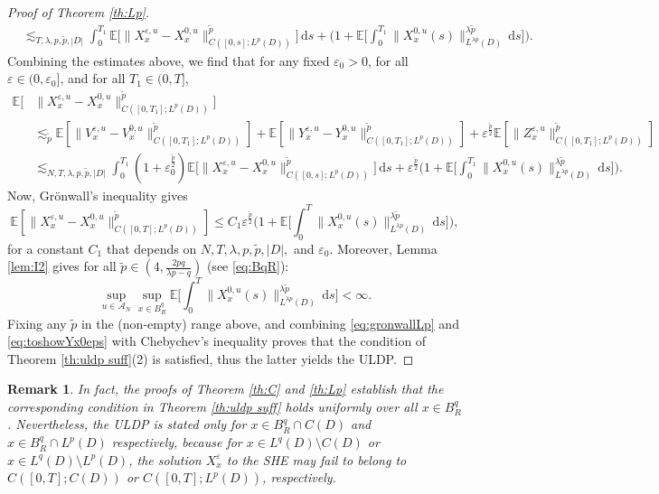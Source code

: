 \documentclass[10pt,a4paper]{amsart}
\newtheorem{remark}[theorem]{Remark}
\numberwithin{equation}{section}
\newcommand{\E}{{\mathbb E}}
\newcommand{\eps}{\varepsilon}
\newcommand{\A}{{\mathcal A}}
\newcommand{\dd}{\,\mathrm{d}}
\begin{document}
\begin{proof}[Proof of Theorem \ref{th:Lp}]
\begin{align*}
  &\lesssim_{T,\lambda,p,\tilde p,|D|} \int_0^{T_1}  \E\big[ \|X_x^{\eps,u}-X_x^{0,u} \|_{C([0,s];L^{p}(D))}^{{\tilde p}}\big]\dd s  + \Big(1+\E\Big[\int_0^{T_1}\|X_x^{0,u}(s)\|_{L^{\lambda p}(D)}^{{\lambda\tilde p}}\dd s\Big]\Big). 
  \end{align*} 
Combining the estimates above, we find that for any fixed $\eps_0>0$, for all $\eps\in(0,\eps_0]$, and for all $T_1\in(0,T]$, 
\begin{align*}
  \E[&\| X_x^{\eps,u} - X_x^{0,u} \|_{C([0,T_1];L^{p}(D))}^{{\tilde p}}] \\
  &\lesssim_{{\tilde p}} \E[\| V_x^{\eps,u} - V_x^{0,u} \|_{C([0,T_1];L^{p}(D))}^{{\tilde p}}]+\E[\| Y_x^{\eps,u} - Y_x^{0,u} \|_{C([0,T_1];L^{p}(D))}^{{\tilde p}}]+\eps^{\frac{{\tilde p}}{2}}\E[\|Z_x^{\eps,u}\|_{C([0,T_1];L^{p}(D))}^{{\tilde p}}]\\
  &\lesssim_{N,T,\lambda, p,\tilde p,|D|} \int_0^{T_1} (1+\eps_0^{\frac{\tilde p}{2}})\E\big[ \|X_x^{\eps,u}-X_x^{0,u} \|_{C([0,s];L^{p}(D))}^{{\tilde p}}\big]\dd s  +\eps^{\frac{{\tilde p}}{2}}\Big(1+\E\Big[\int_0^{T_1}\|X_x^{0,u}(s)\|_{L^{\lambda p}(D)}^{{\lambda\tilde p}}\dd s\Big]\Big). 
  \end{align*}
Now, Gr\"onwall's inequality gives 
\begin{equation}\label{eq:gronwallLp}
\E[\| X_x^{\eps,u} - X_x^{0,u} \|_{C([0,T];L^{p}(D))}^{{\tilde p}}]\leq C_1\eps^{\frac{{\tilde p}}{2}}\Big(1+\E\Big[\int_0^T\|X_x^{0,u}(s)\|_{L^{\lambda p}(D)}^{\lambda\tilde p}\dd s\Big]\Big),
\end{equation}
for a constant $C_1$ that depends on $N,T,\lambda, p,\tilde p,|D|,$ and $\eps_0$. 
Moreover, Lemma \ref{lem:I2} gives for all $\tilde{p}\in(4,\frac{2pq}{\lambda p-q})$ (see \eqref{eq:BqR}):  
\begin{equation}\label{eq:toshowYx0eps}
  \sup_{u\in\A_N}\sup_{x\in B_R^q} \E\Big[\int_0^T\|X_x^{0,u}(s)\|_{L^{\lambda p}(D)}^{\lambda\tilde p}\dd s\Big]<\infty.
\end{equation}  
Fixing any $\tilde p$ in the (non-empty) range above, and combining \eqref{eq:gronwallLp} and \eqref{eq:toshowYx0eps} with  Chebychev's inequality proves that the condition of Theorem \ref{th:uldp suff}(2) is satisfied, thus the latter yields the ULDP.  
\end{proof}

\begin{remark}\label{rem:Lq initial data}
In fact, the proofs of Theorem \ref{th:C} and \ref{th:Lp} establish  that the corresponding  condition in Theorem \ref{th:uldp suff} holds uniformly over all $x\in B_R^q$. Nevertheless, the ULDP is stated only for $x\in B_R^q\cap C(D)$ and  $x\in B_R^q\cap L^p(D)$ respectively, because for $x\in L^q(D)\setminus C(D)$ or $x\in L^q(D)\setminus L^p(D)$, the solution $X_x^\eps$ to the SHE may fail to belong to $C([0,T];C(D))$ or $C([0,T];L^p(D))$, respectively. 
\end{remark}
\end{document}
